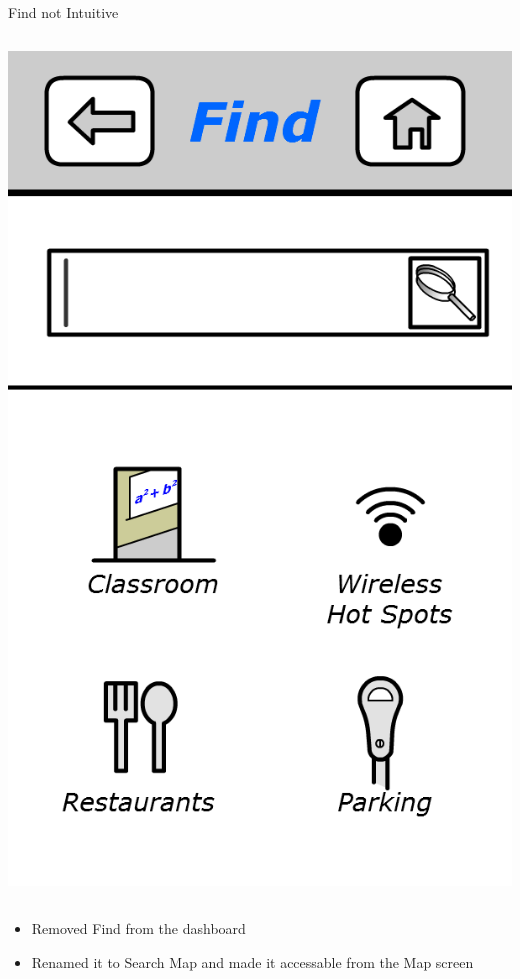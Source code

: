 \documentclass{beamer}
\begin{document}
\begin{frame}{Find not Intuitive}
\begin{columns}[c]
	    \center\includegraphics[height=0.5 \textheight]{digital/find.png}
    \end{columns}
    \begin{itemize}
        \item Removed Find from the dashboard
        \item Renamed it to Search Map and made it accessable from the Map screen
    \end{itemize}
\end{frame}
\end{document}
